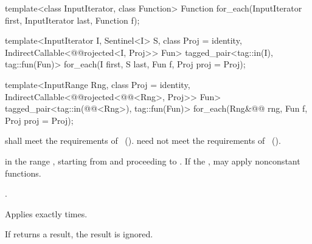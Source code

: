 %
\begin{removedblock}
\begin{itemdecl}
template<class InputIterator, class Function>
  Function for_each(InputIterator first, InputIterator last, Function f);
\end{itemdecl}
\end{removedblock}
\begin{addedblock}
\begin{itemdecl}
template<InputIterator I, Sentinel<I> S, class Proj = identity,
    IndirectCallable<@@rojected<I, Proj>> Fun>
  tagged_pair<tag::in(I), tag::fun(Fun)>
    for_each(I first, S last, Fun f, Proj proj = Proj{});

template<InputRange Rng, class Proj = identity,
    IndirectCallable<@@rojected<@@<Rng>, Proj>> Fun>
  tagged_pair<tag::in(@@<Rng>), tag::fun(Fun)>
    for_each(Rng&@\newtxt{\&}@ rng, Fun f, Proj proj = Proj{});
\end{itemdecl}
\end{addedblock}

\begin{itemdescr}
\begin{removedblock}
\pnum
\requires {} shall meet the requirements of
~().
\enternote {} need not meet the requirements of
~().\exitnote
\end{removedblock}

\pnum
\effects
{} in the range
,
starting from
and proceeding to
.
\enternote If the ,  may apply
nonconstant functions.\exitnote

\pnum
\returns
{}.

\pnum
\complexity
Applies 
exactly
times.

\pnum
\notes
If  returns a result, the result is ignored.
\end{itemdescr}

